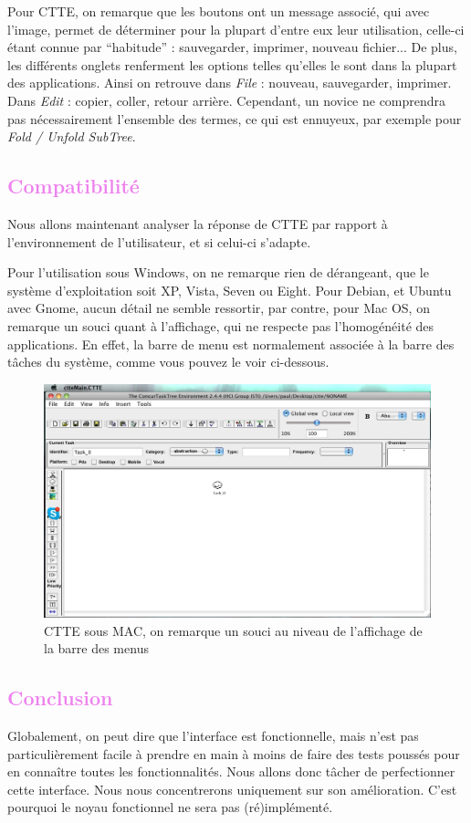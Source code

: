 \documentclass[12pt, a4paper]{article}
\begin{document}
Pour CTTE, on remarque que les boutons ont un message associé, qui avec l'image, permet de déterminer pour la plupart d'entre eux leur utilisation, celle-ci étant connue par ``habitude'' : sauvegarder, imprimer, nouveau fichier... De plus, les différents onglets renferment les options telles qu'elles le sont dans la plupart des applications. Ainsi on retrouve dans \emph{File} : nouveau, sauvegarder, imprimer. Dans \emph{Edit} : copier, coller, retour arrière. Cependant, un novice ne comprendra pas nécessairement l'ensemble des termes, ce qui est ennuyeux, par exemple pour \emph{Fold / Unfold SubTree}.

\textcolor{Violet}{\section{Compatibilité}}
Nous allons maintenant analyser la réponse de CTTE par rapport à l'environnement de l'utilisateur, et si celui-ci s'adapte.


Pour l'utilisation sous Windows, on ne remarque rien de dérangeant, que le système d'exploitation soit XP, Vista, Seven ou Eight. Pour Debian, et Ubuntu avec Gnome, aucun détail ne semble ressortir, par contre, pour Mac OS, on remarque un souci quant à l'affichage, qui ne respecte pas l'homogénéité des applications. En effet, la barre de menu est normalement associée à la barre des tâches du système, comme vous pouvez le voir ci-dessous.

\begin{figure}[h]
   \includegraphics[scale = 0.5]{SoucisIHM.jpg}
	\caption{CTTE sous MAC, on remarque un souci au niveau de l'affichage de la barre des menus}
\end{figure}

\textcolor{Violet}{\section{Conclusion}}
Globalement, on peut dire que l'interface est fonctionnelle, mais n'est pas particulièrement facile à prendre en main à moins de faire 
des tests poussés pour en connaître toutes les fonctionnalités. Nous allons donc tâcher de perfectionner cette interface. 
Nous nous concentrerons uniquement sur son amélioration. C'est pourquoi le noyau fonctionnel ne sera pas (ré)implémenté.
\end{document}

